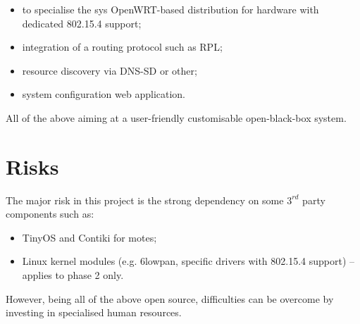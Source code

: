 \documentclass[12pt]{article}
\begin{document}
\begin{itemize}
\item to specialise the sys OpenWRT-based distribution for hardware with dedicated 802.15.4 support;
\item integration of a routing protocol such as RPL;
\item resource discovery via DNS-SD or other;
\item system configuration web application.
\end{itemize}

All of the above aiming at a user-friendly customisable open-black-box system.

\section{Risks}

The major risk in this project is the strong dependency on some $3^{rd}$ party components such as:
\begin{itemize}
\item TinyOS and Contiki for motes;
\item Linux kernel modules (e.g. 6lowpan, specific drivers with 802.15.4 support) -- applies to phase 2 only.
\end{itemize}
However, being all of the above open source, difficulties can be overcome by investing in specialised human resources. 
\end{document}
